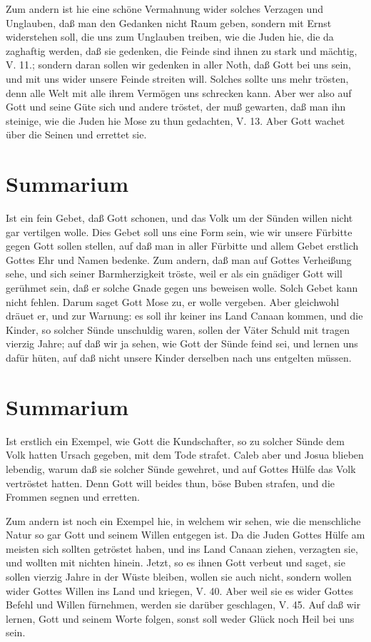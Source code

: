 Zum andern ist hie eine schöne Vermahnung wider solches Verzagen und Unglauben, daß man den Gedanken nicht Raum geben, sondern mit Ernst widerstehen soll, die uns zum Unglauben treiben, wie die Juden hie, die da zaghaftig werden, daß sie gedenken, die Feinde sind ihnen zu stark und mächtig, V. 11.; sondern daran sollen wir gedenken in aller Noth, daß Gott bei uns sein, und mit uns wider unsere Feinde streiten will. Solches sollte uns mehr trösten, denn alle Welt mit alle ihrem Vermögen uns schrecken kann. Aber wer also auf Gott und seine Güte sich und andere tröstet, der muß gewarten, daß man ihn steinige, wie die Juden hie Mose zu thun gedachten, V. 13. Aber Gott wachet über die Seinen und errettet sie.

\section{Summarium}

Ist ein fein Gebet, daß Gott schonen, und das Volk um der Sünden willen nicht gar vertilgen wolle. Dies Gebet soll uns eine Form sein, wie wir unsere Fürbitte gegen Gott sollen stellen, auf daß man in aller Fürbitte und allem Gebet erstlich Gottes Ehr und Namen bedenke. Zum andern, daß man auf Gottes Verheißung sehe, und sich seiner Barmherzigkeit tröste, weil er als ein gnädiger Gott will gerühmet sein, daß er solche Gnade gegen uns beweisen wolle. Solch Gebet kann nicht fehlen. Darum saget Gott Mose zu, er wolle vergeben. Aber gleichwohl dräuet er, und zur Warnung: es soll ihr keiner ins Land Canaan kommen, und die Kinder, so solcher Sünde unschuldig waren, sollen der Väter Schuld mit tragen vierzig Jahre; auf daß wir ja sehen, wie Gott der Sünde feind sei, und lernen uns dafür hüten, auf daß nicht unsere Kinder derselben nach uns entgelten müssen.

\section{Summarium}

Ist erstlich ein Exempel, wie Gott die Kundschafter, so zu solcher Sünde dem Volk hatten Ursach gegeben, mit dem Tode strafet. Caleb aber und Josua blieben lebendig, warum daß sie solcher Sünde gewehret, und auf Gottes Hülfe das Volk vertröstet hatten. Denn Gott will beides thun, böse Buben strafen, und die Frommen segnen und erretten.

Zum andern ist noch ein Exempel hie, in welchem wir sehen, wie die menschliche Natur so gar Gott und seinem Willen entgegen ist. Da die Juden Gottes Hülfe am meisten sich sollten getröstet haben, und ins Land Canaan ziehen, verzagten sie, und wollten mit nichten hinein. Jetzt, so es ihnen Gott verbeut und saget, sie sollen vierzig Jahre in der Wüste bleiben, wollen sie auch nicht, sondern wollen wider Gottes Willen ins Land und kriegen, V. 40. Aber weil sie es wider Gottes Befehl und Willen fürnehmen, werden sie darüber geschlagen, V. 45. Auf daß wir lernen, Gott und seinem Worte folgen, sonst soll weder Glück noch Heil bei uns sein.

